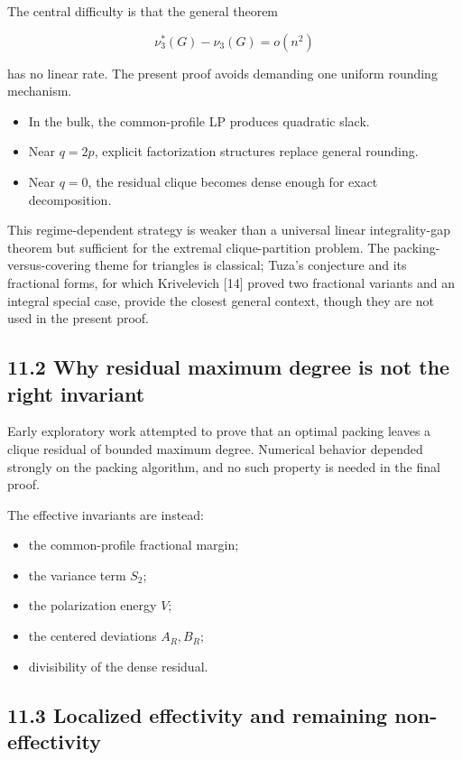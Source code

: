 \documentclass[
  11pt,
]{article}
\providecommand{\tightlist}{%
  \setlength{\itemsep}{0pt}\setlength{\parskip}{0pt}}
\begin{document}
The central difficulty is that the general theorem

\[
\nu_3^*(G)-\nu_3(G)=o(n^2)
\]

has no linear rate. The present proof avoids demanding one uniform
rounding mechanism.

\begin{itemize}
\tightlist
\item
  In the bulk, the common-profile LP produces quadratic slack.
\item
  Near \(q=2p\), explicit factorization structures replace general
  rounding.
\item
  Near \(q=0\), the residual clique becomes dense enough for exact
  decomposition.
\end{itemize}

This regime-dependent strategy is weaker than a universal linear
integrality-gap theorem but sufficient for the extremal clique-partition
problem. The packing-versus-covering theme for triangles is classical;
Tuza's conjecture and its fractional forms, for which Krivelevich
{[}14{]} proved two fractional variants and an integral special case,
provide the closest general context, though they are not used in the
present proof.

\subsection{11.2 Why residual maximum degree is not the right
invariant}\label{why-residual-maximum-degree-is-not-the-right-invariant}

Early exploratory work attempted to prove that an optimal packing leaves
a clique residual of bounded maximum degree. Numerical behavior depended
strongly on the packing algorithm, and no such property is needed in the
final proof.

The effective invariants are instead:

\begin{itemize}
\tightlist
\item
  the common-profile fractional margin;
\item
  the variance term \(S_2\);
\item
  the polarization energy \(V\);
\item
  the centered deviations \(A_R,B_R\);
\item
  divisibility of the dense residual.
\end{itemize}

\subsection{11.3 Localized effectivity and remaining
non-effectivity}\label{localized-effectivity-and-remaining-non-effectivity}
\end{document}
